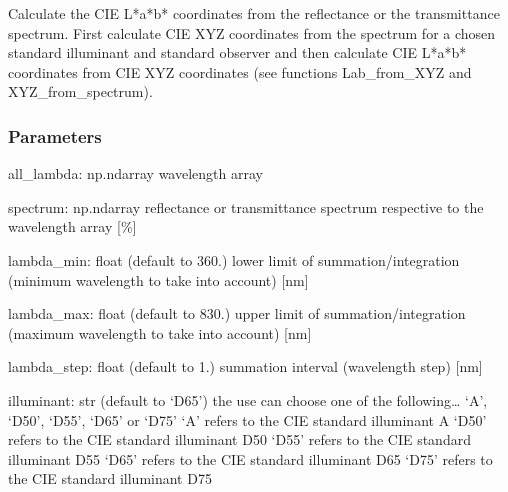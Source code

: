 \documentclass[letterpaper,10pt,english]{sphinxmanual}
\begin{document}
\begin{fulllineitems}
\label{\detokenize{07_colors:skinoptics.colors.Lab_from_spectrum}}
\pysigstartsignatures
{}
\pysigstopsignatures
\sphinxAtStartPar
Calculate the CIE L*a*b* coordinates from the reflectance or the transmittance spectrum.
First calculate CIE XYZ coordinates from the spectrum for a chosen standard illuminant
and standard observer and then calculate CIE L*a*b* coordinates from CIE XYZ coordinates
(see functions Lab\_from\_XYZ and XYZ\_from\_spectrum).


\subsubsection{Parameters}
\label{\detokenize{07_colors:id13}}
\sphinxAtStartPar
all\_lambda: np.ndarray
wavelength array

\sphinxAtStartPar
spectrum: np.ndarray
reflectance or transmittance spectrum respective to the wavelength array {[}\%{]}

\sphinxAtStartPar
lambda\_min: float (default to 360.)
lower limit of summation/integration (minimum wavelength to take into account) {[}nm{]}

\sphinxAtStartPar
lambda\_max: float (default to 830.)
upper limit of summation/integration (maximum wavelength to take into account) {[}nm{]}

\sphinxAtStartPar
lambda\_step: float (default to 1.)
summation interval (wavelength step) {[}nm{]}

\sphinxAtStartPar
illuminant: str (default to ‘D65’)
the use can choose one of the following… ‘A’, ‘D50’, ‘D55’, ‘D65’ or ‘D75’
‘A’ refers to the CIE standard illuminant A
‘D50’ refers to the CIE standard illuminant D50
‘D55’ refers to the CIE standard illuminant D55
‘D65’ refers to the CIE standard illuminant D65
‘D75’ refers to the CIE standard illuminant D75


\end{fulllineitems}
\end{document}

